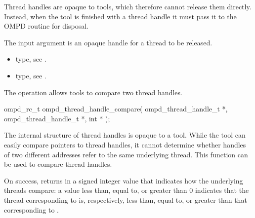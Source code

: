 \descr
Thread handles are opaque to tools, which therefore cannot release them directly.
Instead, when the tool is finished with a thread handle it must pass it to the OMPD
 routine for disposal.

\argdesc
The input argument  is an opaque handle for a thread
to be released.

\crossreferences
\begin{itemize}
  \item {} type, see .
	\item {} type, see .
\end{itemize}


\label{subsubsubsec:ompd_thread_handle_compare}
\summary
The  operation allows tools to compare
two thread handles.

\format

\begin{cspecific}
\begin{ompSyntax}
ompd_rc_t ompd_thread_handle_compare(
  ompd_thread_handle_t *,
  ompd_thread_handle_t *,
  int *
);
\end{ompSyntax}
\end{cspecific}


\descr
The internal structure of thread handles is opaque to a tool. While the tool can easily compare
pointers to thread handles, it cannot determine whether handles of two different addresses
refer to the same underlying thread. This function can be used to compare thread handles.

On success,  returns in  a signed
integer value that indicates how the underlying threads compare: a value less than, equal to, or
greater than 0 indicates that the thread corresponding to  is, respectively,
less than, equal to, or greater than that corresponding to .


